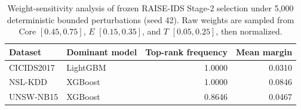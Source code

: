 \begin{table}[!htbp]
\centering
\caption{Weight-sensitivity analysis of frozen RAISE-IDS Stage-2 selection under 5,000 deterministic bounded perturbations (seed 42). Raw weights are sampled from Core $[0.45,0.75]$, $E$ $[0.15,0.35]$, and $T$ $[0.05,0.25]$, then normalized.}
\label{tab:raise_ids_weight_sensitivity}
\small
\begin{tabular}{llrr}
\toprule
Dataset & Dominant model & Top-rank frequency & Mean margin \\
\midrule
CICIDS2017 & LightGBM & 1.0000 & 0.0310 \\
NSL-KDD & XGBoost & 1.0000 & 0.0846 \\
UNSW-NB15 & XGBoost & 0.8646 & 0.0467 \\
\bottomrule
\end{tabular}
\end{table}
